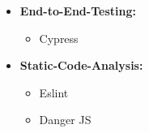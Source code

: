 {\begin{minipage}[t]{0.5\textwidth}
\begin{itemize}
            \item {
                \textbf{End-to-End-Testing:}

                \begin{itemize}
                    \item { Cypress }
                \end{itemize}
            }

            \item {
                \textbf{Static-Code-Analysis:}

                \begin{itemize}
                    \item { Eslint }
                    \item { Danger JS }
                \end{itemize}
            }
        \end{itemize}
    \end{minipage}
}
\clearpage

